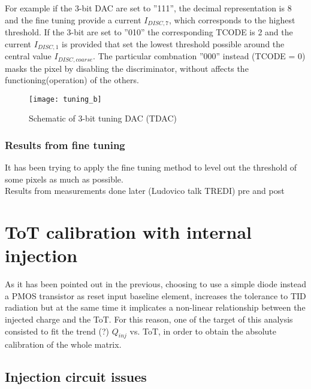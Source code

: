 For example if the 3-bit DAC are set to ''111'', the decimal representation is 8 and the fine tuning provide a current $I_{DISC,7}$, which corresponds to the highest threshold. If the 3-bit are set to ''010'' the corresponding TCODE is 2 and the current $I_{DISC,1}$ is provided that set the lowest threshold possible around the central value $I_{DISC,coarse}$. The particular combnation ''000'' instead (TCODE = 0) masks the pixel by disabling the discriminator, without affects the functioning(operation) of the others.

\begin{figure}
\centering
\texttt{[image: tuning\_b]}
\caption{Schematic of 3-bit tuning DAC (TDAC)}
\label{fig:tdac}
\end{figure}

\subsubsection{Results from fine tuning}

It has been trying to apply the fine tuning method to level out the threshold of some pixels as much as possible. \\

Results from measurements done later (Ludovico talk TREDI) pre and post





\section{ToT calibration with internal injection}


As it has been pointed out in the previous, choosing to use a simple diode instead a PMOS transistor as reset input baseline element, increases the tolerance to TID radiation but at the same time it implicates a non-linear relationship between the injected charge and the ToT.  For this reason, one of the target of this analysis consisted to fit the trend (?) $Q_{inj}$ vs. ToT, in order to obtain the absolute calibration of the whole matrix.


\subsection{Injection circuit issues}

